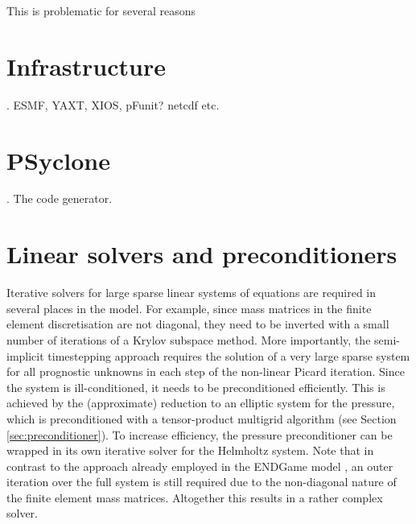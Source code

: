 \documentclass[times]{elsarticle}
\begin{document}
This is problematic for several reasons 
\section{\label{sec:lib}Infrastructure}.
ESMF, YAXT, XIOS, pFunit? netcdf etc.

\section{\label{sec:Psyclone}PSyclone}.
The code generator.

\section{\label{sec:Solver}Linear solvers and preconditioners}
Iterative solvers for large sparse linear systems of equations are required in several places in the model. For example, since mass matrices in the finite element discretisation are not diagonal, they need to be inverted with a small number of iterations of a Krylov subspace method. More importantly, the semi-implicit timestepping approach requires the solution of a very large sparse system for all prognostic unknowns in each step of the non-linear Picard iteration. Since the system is ill-conditioned, it needs to be preconditioned efficiently. This is achieved by the (approximate) reduction to an elliptic system for the pressure, which is preconditioned with a tensor-product multigrid algorithm \cite{Borm2001} (see Section \ref{sec:preconditioner}). To increase efficiency, the pressure preconditioner can be wrapped in its own iterative solver for the Helmholtz system. Note that in contrast to the  approach already employed in the ENDGame model \cite{QJ:QJ2235}, an outer iteration over the full system is still required due to the non-diagonal nature of the finite element mass matrices. Altogether this results in a rather complex solver.
\end{document}
